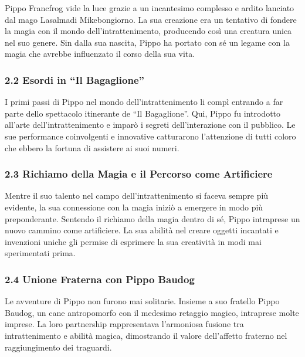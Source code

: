 Pippo Francfrog vide la luce grazie a un incantesimo complesso e ardito
lanciato dal mago Lasalmadi Mikebongiorno. La sua creazione era un
tentativo di fondere la magia con il mondo dell'intrattenimento,
producendo così una creatura unica nel suo genere. Sin dalla sua
nascita, Pippo ha portato con sé un legame con la magia che avrebbe
influenzato il corso della sua vita.

\subsubsection{\texorpdfstring{2.2 \textbf{Esordi in ``Il
Bagaglione''}}{2.2 Esordi in ``Il Bagaglione''}}\label{esordi-in-il-bagaglione}

I primi passi di Pippo nel mondo dell'intrattenimento li compì entrando
a far parte dello spettacolo itinerante de ``Il Bagaglione''. Qui, Pippo
fu introdotto all'arte dell'intrattenimento e imparò i segreti
dell'interazione con il pubblico. Le sue performance coinvolgenti e
innovative catturarono l'attenzione di tutti coloro che ebbero la
fortuna di assistere ai suoi numeri.

\subsubsection{\texorpdfstring{2.3 \textbf{Richiamo della Magia e il
Percorso come
Artificiere}}{2.3 Richiamo della Magia e il Percorso come Artificiere}}\label{richiamo-della-magia-e-il-percorso-come-artificiere}

Mentre il suo talento nel campo dell'intrattenimento si faceva sempre
più evidente, la sua connessione con la magia iniziò a emergere in modo
più preponderante. Sentendo il richiamo della magia dentro di sé, Pippo
intraprese un nuovo cammino come artificiere. La sua abilità nel creare
oggetti incantati e invenzioni uniche gli permise di esprimere la sua
creatività in modi mai sperimentati prima.

\subsubsection{\texorpdfstring{2.4 \textbf{Unione Fraterna con Pippo
Baudog}}{2.4 Unione Fraterna con Pippo Baudog}}\label{unione-fraterna-con-pippo-baudog}

Le avventure di Pippo non furono mai solitarie. Insieme a suo fratello
Pippo Baudog, un cane antropomorfo con il medesimo retaggio magico,
intraprese molte imprese. La loro partnership rappresentava l'armoniosa
fusione tra intrattenimento e abilità magica, dimostrando il valore
dell'affetto fraterno nel raggiungimento dei traguardi.

